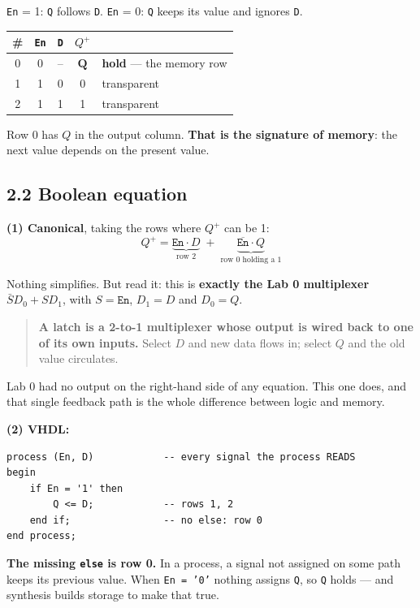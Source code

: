 \documentclass[11pt]{article}
\newcommand{\code}[1]{\texttt{#1}}
\begin{document}
\code{En} = 1: \code{Q} follows \code{D}. \quad \code{En} = 0: \code{Q} keeps its
value and ignores \code{D}.

\begin{center}
\begin{tabular}{c|cc|c|l}
\toprule
\# & \code{En} & \code{D} & $Q^{+}$ & \\
\midrule
0 & 0 & -- & $\mathbf{Q}$ & \textbf{hold} --- the memory row \\
1 & 1 & 0 & 0 & transparent \\
2 & 1 & 1 & 1 & transparent \\
\bottomrule
\end{tabular}
\end{center}

Row 0 has $Q$ in the output column. \textbf{That is the signature of memory}: the
next value depends on the present value.

\subsection*{2.2 Boolean equation}

\textbf{(1) Canonical}, taking the rows where $Q^{+}$ can be 1:
\[
Q^{+} = \underbrace{\code{En}\cdot D}_{\text{row 2}} \;+\; \underbrace{\overline{\code{En}}\cdot Q}_{\text{row 0 holding a 1}}
\]

Nothing simplifies. But read it: this is \textbf{exactly the Lab 0 multiplexer}
$\bar{S}D_0 + SD_1$, with $S = \code{En}$, $D_1 = D$ and $D_0 = Q$.

\begin{quote}
\textbf{A latch is a 2-to-1 multiplexer whose output is wired back to one of its own
inputs.} Select $D$ and new data flows in; select $Q$ and the old value circulates.
\end{quote}

Lab 0 had no output on the right-hand side of any equation. This one does, and that
single feedback path is the whole difference between logic and memory.

\textbf{(2) VHDL:}
\begin{lstlisting}
process (En, D)            -- every signal the process READS
begin
    if En = '1' then
        Q <= D;            -- rows 1, 2
    end if;                -- no else: row 0
end process;
\end{lstlisting}

\textbf{The missing \code{else} is row 0.} In a process, a signal not assigned on
some path keeps its previous value. When \code{En = '0'} nothing assigns \code{Q}, so
\code{Q} holds --- and synthesis builds storage to make that true.
\end{document}
